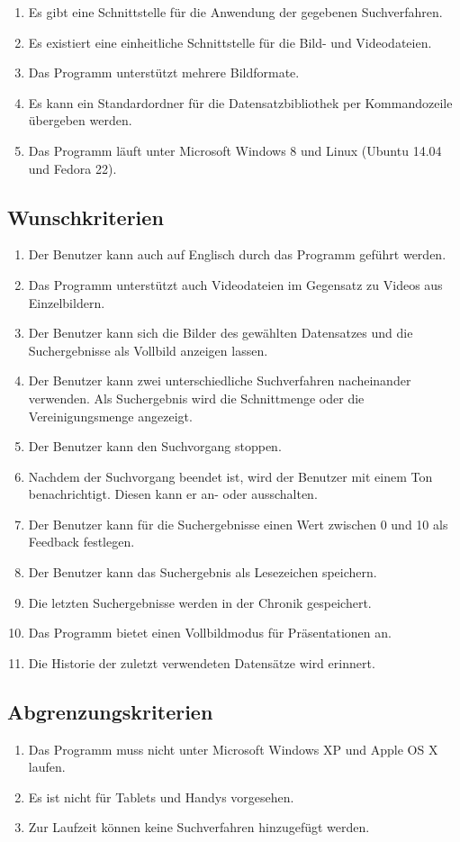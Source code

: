 \begin{enumerate} [label=\bfseries /MK \arabic*0/, leftmargin=*]
\item Es gibt eine Schnittstelle für die Anwendung der gegebenen Suchverfahren.
\item Es existiert eine einheitliche Schnittstelle für die Bild- und Videodateien.
\item Das Programm unterstützt mehrere Bildformate.
\item Es kann ein Standardordner für die Datensatzbibliothek per Kommandozeile übergeben werden.
\item Das Programm läuft unter Microsoft Windows 8 und Linux (Ubuntu 14.04 und Fedora 22).
\end{enumerate}
\subsection{Wunschkriterien}
\begin{enumerate} [label=\bfseries /WK \arabic*0/, leftmargin=*]
\item Der Benutzer kann auch auf Englisch durch das Programm geführt werden.
\item Das Programm unterstützt auch Videodateien im Gegensatz zu Videos aus Einzelbildern.
\item Der Benutzer kann sich die Bilder des gewählten Datensatzes und die Suchergebnisse als Vollbild anzeigen lassen.
\item Der Benutzer kann zwei unterschiedliche Suchverfahren nacheinander verwenden. Als Suchergebnis wird die Schnittmenge oder die Vereinigungsmenge angezeigt.
\item Der Benutzer kann den Suchvorgang stoppen.
\item Nachdem der Suchvorgang beendet ist, wird der Benutzer mit einem Ton benachrichtigt. Diesen kann er an- oder ausschalten.
\item Der Benutzer kann für die Suchergebnisse einen Wert zwischen 0 und 10 als \gls{Feedback} festlegen.
\item Der Benutzer kann das Suchergebnis als \gls{Lesezeichen} speichern.
\item Die letzten Suchergebnisse werden in der \gls{Chronik} gespeichert.
\item Das Programm bietet einen Vollbildmodus für Präsentationen an.
\item Die Historie der zuletzt verwendeten Datensätze wird erinnert.
\end{enumerate}
\subsection{Abgrenzungskriterien}
\begin{enumerate} [label=\bfseries /AK \arabic*0/, leftmargin=*]
\item Das Programm muss nicht unter Microsoft Windows XP und Apple OS X laufen. 
\item Es ist nicht für Tablets und Handys vorgesehen.
\item Zur Laufzeit können keine Suchverfahren hinzugefügt werden.
\end{enumerate}
\pagebreak
